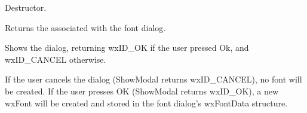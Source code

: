 
Destructor.



Returns the  associated with the font dialog.



Shows the dialog, returning wxID\_OK if the user pressed Ok, and wxID\_CANCEL
otherwise.

If the user cancels the dialog (ShowModal returns wxID\_CANCEL), no font will be
created. If the user presses OK (ShowModal returns wxID\_OK), a new wxFont will
be created and stored in the font dialog's wxFontData structure.

